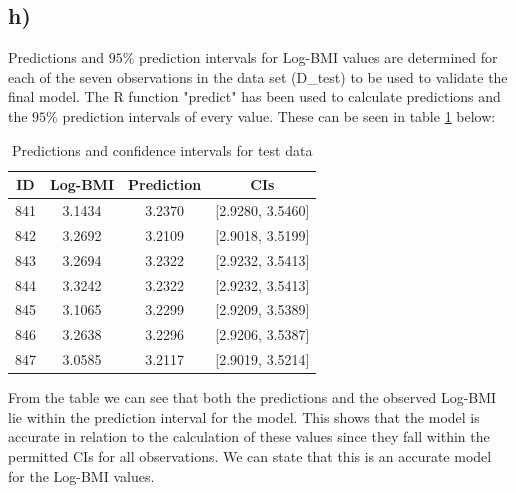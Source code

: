 \subsection{h)}
Predictions and $95\%$ prediction intervals for Log-BMI values are determined for each of the seven observations in the data set (D\_test) to be used to validate the final model. The R function "predict" has been used to calculate predictions and the $95\%$ prediction intervals of every value. These can be seen in table \ref{PredAndCI} below:
\begin{table}[h!]
\centering
\begin{tabular}{|c||c|c||c|}
  \hline
ID & Log-BMI & Prediction & CIs \\
 \hline
 \hline
841 & 3.1434 & 3.2370 & [2.9280, 3.5460] \\
\hline
842 & 3.2692 & 3.2109 & [2.9018, 3.5199] \\
\hline
843 & 3.2694 & 3.2322 & [2.9232, 3.5413] \\
\hline
844 & 3.3242 & 3.2322 & [2.9232, 3.5413] \\
\hline
845 & 3.1065 & 3.2299 & [2.9209, 3.5389] \\
\hline
846 & 3.2638 & 3.2296 & [2.9206, 3.5387] \\
\hline
847 & 3.0585 & 3.2117 & [2.9019, 3.5214] \\
\hline
\end{tabular}
\caption{Predictions and confidence intervals for test data}
\label{PredAndCI}
\end{table} 
From the table we can see that both the predictions and the observed Log-BMI lie within the prediction interval for the model. This shows that the model is accurate in relation to the calculation of these values since they fall within the permitted CIs for all observations. We can state that this is an accurate model for the Log-BMI values.